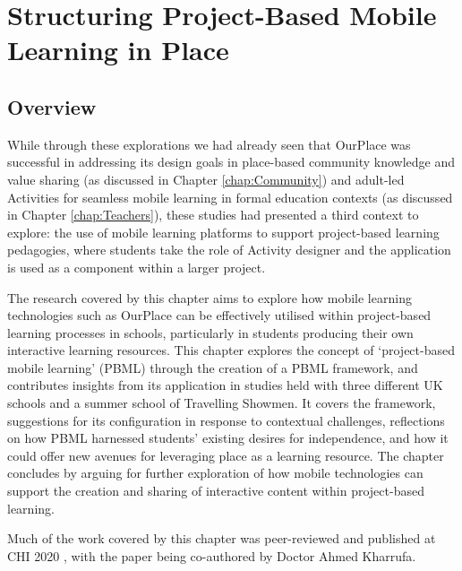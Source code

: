 \chapter{Structuring Project-Based Mobile Learning in Place}
\label{chap:student-created}

\section{Overview}
While through these explorations we had already seen that OurPlace was successful in addressing its design goals in place-based community knowledge and value sharing (as discussed in Chapter \ref{chap:Community}) and adult-led Activities for seamless mobile learning in formal education contexts (as discussed in Chapter \ref{chap:Teachers}), these studies had presented a third context to explore: the use of mobile learning platforms to support project-based learning pedagogies, where students take the role of Activity designer and the application is used as a component within a larger project.

The research covered by this chapter aims to explore how mobile learning technologies such as OurPlace can be effectively utilised within project-based learning processes in schools, particularly in students producing their own interactive learning resources. This chapter explores the concept of `project-based mobile learning' (PBML) through the creation of a PBML framework, and contributes insights from its application in studies held with three different UK schools and a summer school of Travelling Showmen. It covers the framework, suggestions for its configuration in response to contextual challenges, reflections on how PBML harnessed students' existing desires for independence, and how it could offer new avenues for leveraging place as a learning resource. The chapter concludes by arguing for further exploration of how mobile technologies can support the creation and sharing of interactive content within project-based learning.

Much  of the work covered by this chapter was peer-reviewed and published at CHI 2020 \citep{Richardson2020}, with the paper being co-authored by Doctor Ahmed Kharrufa.

